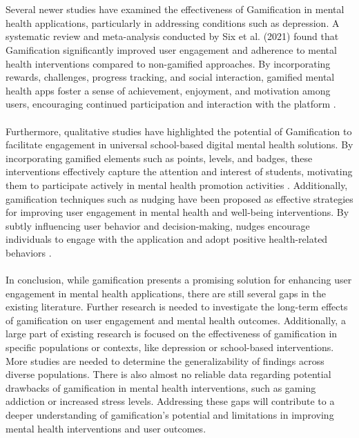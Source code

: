 \documentclass[manuscript,screen,review]{acmart}
\begin{document}
\\ \\
Several newer studies have examined the effectiveness of Gamification in mental health applications, particularly in addressing conditions such as depression. A systematic review and meta-analysis conducted by Six et al. \cite{Six21} (2021) found that Gamification significantly improved user engagement and adherence to mental health interventions compared to non-gamified approaches. By incorporating rewards, challenges, progress tracking, and social interaction, gamified mental health apps foster a sense of achievement, enjoyment, and motivation among users, encouraging continued participation and interaction with the platform \cite{Bitrian21}.
\\ \\
Furthermore, qualitative studies have highlighted the potential of Gamification to facilitate engagement in universal school-based digital mental health solutions. By incorporating gamified elements such as points, levels, and badges, these interventions effectively capture the attention and interest of students, motivating them to participate actively in mental health promotion activities \cite{Badawi23}. Additionally, gamification techniques such as nudging have been proposed as effective strategies for improving user engagement in mental health and well-being interventions. By subtly influencing user behavior and decision-making, nudges encourage individuals to engage with the application and adopt positive health-related behaviors \cite{Auf21}.
\\ \\ 
In conclusion, while gamification presents a promising solution for enhancing user engagement in mental health applications, there are still several gaps in the existing literature. Further research is needed to investigate the long-term effects of gamification on user engagement and mental health outcomes. Additionally, a large part of existing research is focused on the effectiveness of gamification in specific populations or contexts, like depression or school-based interventions. More studies are needed to determine the generalizability of findings across diverse populations. There is also almost no reliable data regarding potential drawbacks of gamification in mental health interventions, such as gaming addiction or increased stress levels. Addressing these gaps will contribute to a deeper understanding of gamification's potential and limitations in improving mental health interventions and user outcomes.
\end{document}
